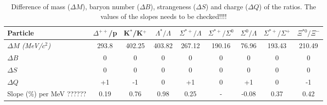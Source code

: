 \vspace{6pt}
 \begin{center}
\begin{table}[!htb] 
\caption{\label{diff} Difference of mass ($\Delta M$), baryon number ($\Delta B$), strangeness ($\Delta S$) and charge ($\Delta Q$) of the ratios. The values of the slopes needs to be checked!!!!}
\centering
 \begin{tabular}{lcccccccc}
 	 		\hline
\hline
Particle&$\Delta^{++}$/p & K$^{*}$/K$^{+}$& $\Lambda^{*}/\Lambda$&$\Sigma^{*+}/\Lambda$  &$\Sigma^{*+}/\Sigma^{0}$ &$\Sigma^{0}/\Lambda$ & $\Sigma^{*+}/\Sigma^{+}$ & $\Xi^{*0}/\Xi^{-}$\\
\hline
\textit{$\Delta M$ ({\rm MeV}/$c^{2}$)}&293.8&402.25&403.82&267.12&190.16&76.96&193.43&210.49\\
\textit{$\Delta B$}&0&0&0&0&0&0&0&0\\
\textit{$\Delta S$}&0&0&0&0&0&0&0&0\\
\textit{$\Delta Q$}&+1&-1&0&+1&0&+1&0&-1\\
\hline
Slope (\%) per MeV ??????& 0.19 &0.76& 0.98& 0.25 & - & -0.08 &0.37 &0.42\\
 \hline
\end{tabular}
\end{table}
\end{center}


